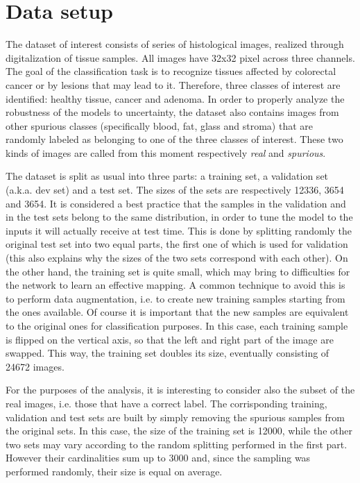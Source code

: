 \documentclass[11pt,twoside,a4paper]{article}
\begin{document}
\section{Data setup}
\label{sec:data}
The dataset of interest consists of series of histological images, realized through digitalization of tissue samples. All images have 32x32 pixel across three channels.\newline
The goal of the classification task is to recognize tissues affected by colorectal cancer or by lesions that may lead to it. Therefore, three classes of interest are identified: healthy tissue, cancer and adenoma. In order to properly analyze the robustness of the models to uncertainty, the dataset also contains images from other spurious classes (specifically blood, fat, glass and stroma) that are randomly labeled as belonging to one of the three classes of interest. These two kinds of images are called from this moment respectively \textit{real} and \textit{spurious}.

The dataset is split as usual into three parts: a training set, a validation set (a.k.a. dev set) and a test set. The sizes of the sets are respectively 12336, 3654 and 3654. It is considered a best practice \cite{ng2017machine} that the samples in the validation and in the test sets belong to the same distribution, in order to tune the model to the inputs it will actually receive at test time. This is done by splitting randomly the original test set into two equal parts, the first one of which is used for validation (this also explains why the sizes of the two sets correspond with each other).\newline
On the other hand, the training set is quite small, which may bring to difficulties for the network to learn an effective mapping. A common technique to avoid this is to perform data augmentation, i.e. to create new training samples starting from the ones available. Of course it is important that the new samples are equivalent to the original ones for classification purposes. In this case, each training sample is flipped on the vertical axis, so that the left and right part of the image are swapped. This way, the training set doubles its size, eventually consisting of 24672 images.

For the purposes of the analysis, it is interesting to consider also the subset of the real images, i.e. those that have a correct label.
The corrisponding training, validation and test sets are built by simply removing the spurious samples from the original sets. In this case, the size of the training set is 12000, while the other two sets may vary according to the random splitting performed in the first part. However their cardinalities sum up to 3000 and, since the sampling was performed randomly, their size is equal on average.
\end{document}
